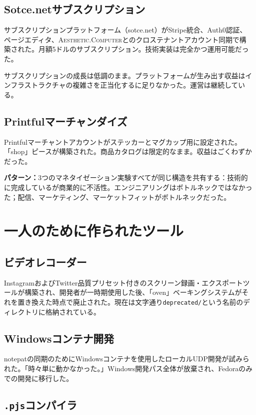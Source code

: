 \documentclass[10pt,letterpaper,twocolumn]{article}
\newcommand{\ac}{\textsc{Aesthetic.Computer}}
\begin{document}
\subsection{Sotce.netサブスクリプション}

サブスクリプションプラットフォーム（sotce.net）がStripe統合、Auth0認証、ページエディタ、\ac{}とのクロステナントアカウント同期で構築された。月額5ドルのサブスクリプション。技術実装は完全かつ運用可能だった。

サブスクリプションの成長は低調のまま。プラットフォームが生み出す収益はインフラストラクチャの複雑さを正当化するに足りなかった。運営は継続している。

\subsection{Printfulマーチャンダイズ}

Printfulマーチャントアカウントがステッカーとマグカップ用に設定された。「shop」ピースが構築された。商品カタログは限定的なまま。収益はごくわずかだった。

\textbf{パターン：}3つのマネタイゼーション実験すべてが同じ構造を共有する：技術的に完成しているが商業的に不活性。エンジニアリングはボトルネックではなかった；配信、マーケティング、マーケットフィットがボトルネックだった。

\section{一人のために作られたツール}

\subsection{ビデオレコーダー}

InstagramおよびTwitter品質プリセット付きのスクリーン録画・エクスポートツールが構築され、開発者が一時期使用した後、「oven」ベーキングシステムがそれを置き換えた時点で廃止された。現在は文字通り\texttt{deprecated/}という名前のディレクトリに格納されている。

\subsection{Windowsコンテナ開発}

notepatの同期のためにWindowsコンテナを使用したローカルUDP開発が試みられた。「時々単に動かなかった。」Windows開発パス全体が放棄され、Fedoraのみでの開発に移行した。

\subsection{\texttt{.pjs}コンパイラ}
\end{document}
